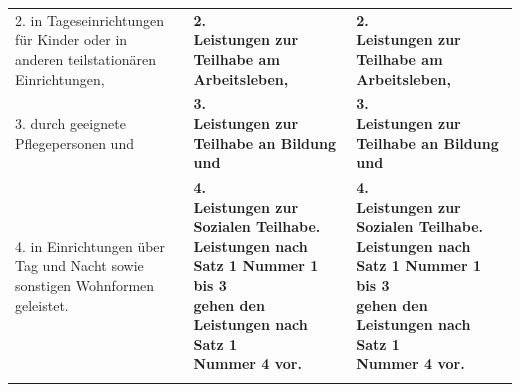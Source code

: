 \documentclass[10pt,a4paper,landscape]{article}
\begin{document}
\begin{longtable}{|L{8.2cm}|L{8.2cm}|L{8.2cm}|}
\hhline{|---|}
2.  \newline \textcolor{diffred}{in Tageseinrichtungen für Kinder oder in  \newline anderen teilstationären Einrichtungen,} & \textbf{2.   \newline Leistungen zur Teilhabe am  \newline Arbeitsleben, } & \textbf{2.   \newline Leistungen zur Teilhabe am  \newline Arbeitsleben, } \\
\hhline{|---|}
3.   \newline \textcolor{diffred}{durch geeignete Pflegepersonen} und & \textbf{3.   \newline Leistungen zur Teilhabe an Bildung und } & \textbf{3.   \newline Leistungen zur Teilhabe an Bildung und } \\
\hhline{|---|}
4.   \newline \textcolor{diffred}{in Einrichtungen über Tag und Nacht sowie  \newline sonstigen Wohnformen geleistet.} & \textbf{4.   \newline Leistungen zur Sozialen Teilhabe.  \newline Leistungen nach Satz 1 Nummer 1 bis 3  \newline gehen den Leistungen nach Satz 1  \newline Nummer 4 vor. } & \textbf{4.   \newline Leistungen zur Sozialen Teilhabe.   \newline Leistungen nach Satz 1 Nummer 1 bis 3  \newline gehen den Leistungen nach Satz 1  \newline Nummer 4 vor. } \\
\hhline{|---|}

\end{longtable}
\end{document}
